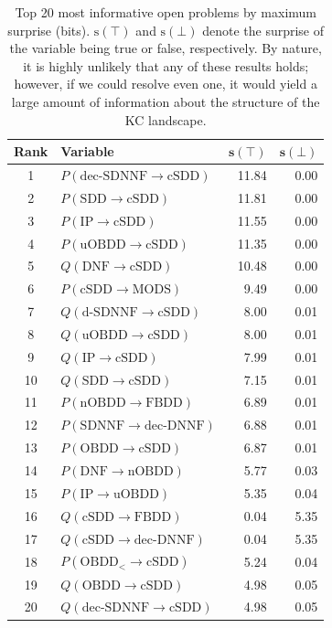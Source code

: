\documentclass[10pt]{article}
\theoremstyle{plain}
\theoremstyle{definition}
\theoremstyle{remark}
\begin{document}
\begin{table}[ht]
\centering
\small
\caption{Top 20 most informative open problems by maximum surprise (bits). $\text{s}(\top)$ and $\text{s}(\bot)$ denote the surprise of the variable being true or false, respectively. By nature, it is highly unlikely that any of these results holds; however, if we could resolve even one, it would yield a large amount of information about the structure of the KC landscape.}
\label{tab:surprise}
\begin{tabular}{clrr}
\textbf{Rank} & \textbf{Variable} & $\mathbf{s(\top)}$ & $\mathbf{s(\bot)}$ \\ \hline
1 & $P(\text{dec-SDNNF} \to \text{cSDD})$ & 11.84 & 0.00 \\
2 & $P(\text{SDD} \to \text{cSDD})$ & 11.81 & 0.00 \\
3 & $P(\text{IP} \to \text{cSDD})$ & 11.55 & 0.00 \\
4 & $P(\text{uOBDD} \to \text{cSDD})$ & 11.35 & 0.00 \\
5 & $Q(\text{DNF} \to \text{cSDD})$ & 10.48 & 0.00 \\
6 & $P(\text{cSDD} \to \text{MODS})$ & 9.49 & 0.00 \\
7 & $Q(\text{d-SDNNF} \to \text{cSDD})$ & 8.00 & 0.01 \\
8 & $Q(\text{uOBDD} \to \text{cSDD})$ & 8.00 & 0.01 \\
9 & $Q(\text{IP} \to \text{cSDD})$ & 7.99 & 0.01 \\
10 & $Q(\text{SDD} \to \text{cSDD})$ & 7.15 & 0.01 \\
11 & $P(\text{nOBDD} \to \text{FBDD})$ & 6.89 & 0.01 \\
12 & $P(\text{SDNNF} \to \text{dec-DNNF})$ & 6.88 & 0.01 \\
13 & $P(\text{OBDD} \to \text{cSDD})$ & 6.87 & 0.01 \\
14 & $P(\text{DNF} \to \text{nOBDD})$ & 5.77 & 0.03 \\
15 & $P(\text{IP} \to \text{uOBDD})$ & 5.35 & 0.04 \\
16 & $Q(\text{cSDD} \to \text{FBDD})$ & 0.04 & 5.35 \\
17 & $Q(\text{cSDD} \to \text{dec-DNNF})$ & 0.04 & 5.35 \\
18 & $P(\text{OBDD}_< \to \text{cSDD})$ & 5.24 & 0.04 \\
19 & $Q(\text{OBDD} \to \text{cSDD})$ & 4.98 & 0.05 \\
20 & $Q(\text{dec-SDNNF} \to \text{cSDD})$ & 4.98 & 0.05 \\
\end{tabular}
\end{table}
\end{document}
